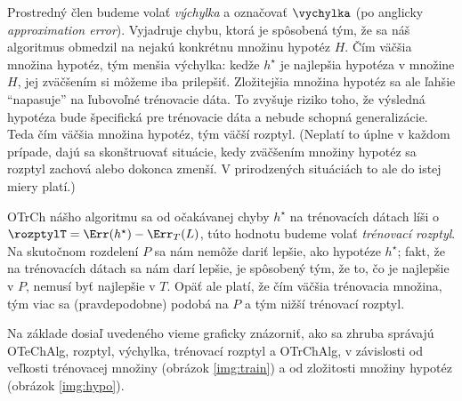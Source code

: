 Prostredný člen budeme volať \emph{výchylka} a označovať $\vychylka$
(po anglicky \emph{approximation error}). Vyjadruje chybu, ktorá je spôsobená tým,
že sa náš algoritmus obmedzil na nejakú konkrétnu množinu hypotéz $H$.
Čím väčšia množina hypotéz, tým menšia výchylka: kedže $h^\star$ je
najlepšia hypotéza v množine $H$, jej zväčšením si môžeme iba prilepšiť.
Zložitejšia množina hypotéz sa ale ľahšie ``napasuje'' na ľubovoľné
trénovacie dáta. To zvyšuje riziko toho, že výsledná hypotéza bude
špecifická pre trénovacie dáta a nebude schopná generalizácie. Teda
čím väčšia množina hypotéz, tým väčší rozptyl. (Neplatí to úplne
v každom prípade, dajú sa skonštruovať situácie, kedy zväčšením
množiny hypotéz sa rozptyl zachová alebo dokonca zmenší. V prirodzených
situáciách to ale do istej miery platí.)

OTrCh nášho algoritmu sa od očakávanej chyby $h^\star$ na trénovacích
dátach líši o $\rozptylT = \Err(h^\star) - \Err_T(L)$, túto hodnotu
budeme volať \emph{trénovací rozptyl}. Na skutočnom rozdelení $P$ sa
nám nemôže dariť lepšie, ako hypotéze $h^\star$; fakt, že na trénovacích
dátach sa nám darí lepšie, je spôsobený tým, že to, čo je najlepšie
v $P$, nemusí byť najlepšie v $T$. Opäť ale platí, že čím väčšia
trénovacia množina, tým viac sa (pravdepodobne) podobá na $P$ a
tým nižší trénovací rozptyl.

Na základe dosiaľ uvedeného vieme graficky znázorniť, ako sa zhruba správajú
OTeChAlg, rozptyl, výchylka, trénovací rozptyl a OTrChAlg, v závislosti od
veľkosti trénovacej množiny (obrázok \ref{img:train}) a od zložitosti
množiny hypotéz (obrázok \ref{img:hypo}).
